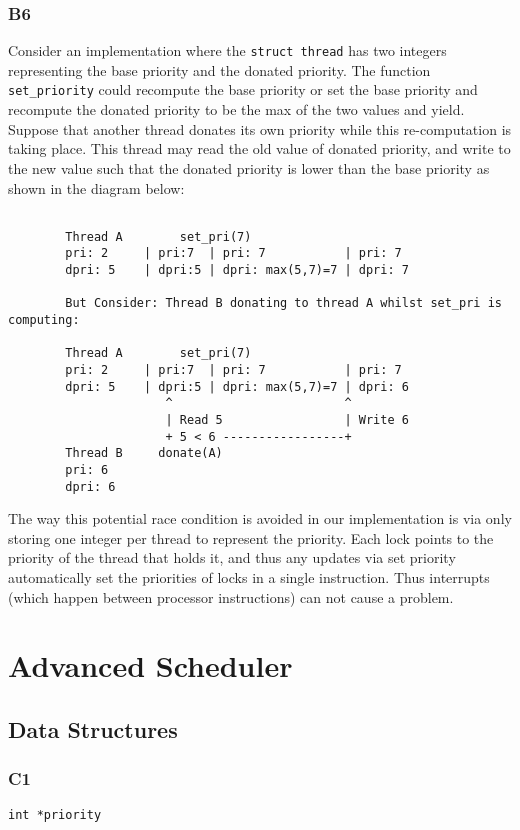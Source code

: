 \documentclass[a4wide, 11pt]{article}
\newcommand{\tx}{\texttt}
\begin{document}
\subsubsection{B6}
Consider an implementation where the \tx{struct thread} has two integers representing the base priority and the donated priority. The function \tx{set\_priority} could recompute the base priority or set the base priority and recompute the donated priority to be the max of the two values and yield. Suppose that another thread donates its own priority while this re-computation is taking place. This thread may read the old value of donated priority, and write to the new value such that the donated priority is lower than the base priority as shown in the diagram below:
\begin{verbatim}

        Thread A        set_pri(7)
        pri: 2     | pri:7  | pri: 7           | pri: 7
        dpri: 5    | dpri:5 | dpri: max(5,7)=7 | dpri: 7

        But Consider: Thread B donating to thread A whilst set_pri is computing: 

        Thread A        set_pri(7)
        pri: 2     | pri:7  | pri: 7           | pri: 7
        dpri: 5    | dpri:5 | dpri: max(5,7)=7 | dpri: 6
                      ^                        ^
                      | Read 5                 | Write 6
                      + 5 < 6 -----------------+
        Thread B     donate(A)
        pri: 6
        dpri: 6 
\end{verbatim}    

The way this potential race condition is avoided in our implementation is via only storing one integer per thread to represent the priority. Each lock points to the priority of the thread that holds it, and thus any updates via set priority automatically set the priorities of locks in a single instruction. Thus interrupts (which happen between processor instructions) can not cause a problem.

\section{Advanced Scheduler}
\subsection{Data Structures}
\subsubsection{C1}\tx{int *priority}
\end{document}
